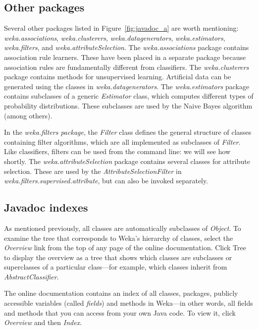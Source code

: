 \subsection{Other packages}

Several other packages listed in Figure~\ref{fig:javadoc_a} are worth mentioning:
\textit{weka.associations}, \textit{weka.clusterers}, \textit{weka.datagenerators},
\textit{weka.estimators}, \textit{weka.filters}, and \newline
\textit{weka.attributeSelection}. The
\textit{weka.associations} package contains association rule learners. These
have been placed in a separate package because association rules are
fundamentally different from classifiers. The \textit{weka.clusterers} package
contains methods for unsupervised learning. Artificial data can be
generated using the classes in \textit{weka.datagenerators}. The
\textit{weka.estimators} package contains subclasses of a generic \textit{Estimator}
class, which computes different types of probability
distributions. These subclasses are used by the Naive Bayes algorithm
(among others).

In the \textit{weka.filters package}, the \textit{Filter} class
defines the general structure of classes containing filter algorithms,
which are all implemented as subclasses of \textit{Filter}. Like classifiers,
filters can be used from the command line: we will see how
shortly. The \textit{weka.attributeSelection} package contains several classes
for attribute selection. These are used by the
\textit{AttributeSelectionFilter} in \newline
\textit{weka.filters.supervised.attribute}, but can also be invoked separately.

\subsection{Javadoc indexes}

As mentioned previously, all classes are automatically subclasses of
\textit{Object}. To examine the tree that corresponds to Weka's hierarchy of
classes, select the \textit{Overview} link from the top of any page of
the online documentation. Click Tree to display the overview as a tree
that shows which classes are subclasses or superclasses of a
particular class---for example, which classes inherit from
\textit{AbstractClassifier}.

The online documentation contains an index of all classes, packages,
publicly accessible variables (called \textit{fields}) and methods in
Weka---in other words, all fields and methods that you can access from
your own Java code. To view it, click \textit{Overview} and
then \textit{Index}.

